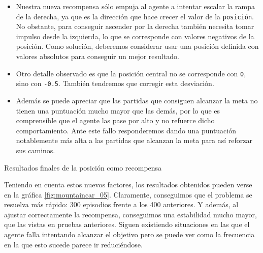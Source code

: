 \begin{itemize}
    \item Nuestra nueva recompensa sólo empuja al agente a intentar escalar la rampa de la derecha, ya que es la dirección que hace crecer el valor de la \texttt{posición}. No obstante, para conseguir ascender por la derecha también necesita tomar impulso desde la izquierda, lo que se corresponde con valores negativos de la posición. Como solución, deberemos considerar usar una posición definida con valores absolutos para conseguir un mejor resultado.
    \item Otro detalle observado es que la posición central no se corresponde con \texttt{0}, sino con \texttt{-0.5}. También tendremos que corregir esta desviación.
    \item Además se puede apreciar que las partidas que consiguen alcanzar la meta no tienen una puntuación mucho mayor que las demás, por lo que es comprensible que el agente las pase por alto y no refuerce dicho comportamiento. Ante este fallo responderemos dando una puntuación notablemente más alta a las partidas que alcanzan la meta para así reforzar sus caminos.  
\end{itemize}

%
       {Resultados finales de la posición como recompensa}

Teniendo en cuenta estos nuevos factores, los resultados obtenidos pueden verse en la gráfica \ref{fig:mountaincar_05}. Claramente, conseguimos que el problema se resuelva más rápido: 300 episodios frente a los 400 anteriores. Y además, al ajustar correctamente la recompensa, conseguimos una estabilidad mucho mayor, que las vistas en pruebas anteriores. Siguen existiendo situaciones en las que el agente falla intentando alcanzar el objetivo pero se puede ver como la frecuencia en la que esto sucede parece ir reduciéndose.

